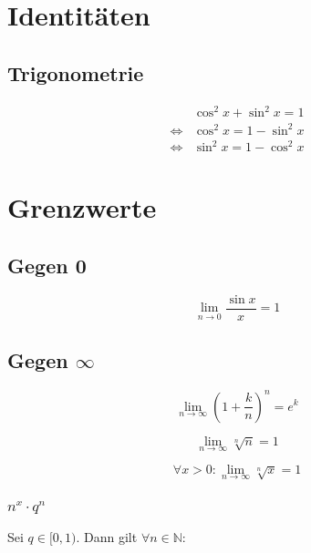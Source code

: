 \documentclass[a4paper, 16pt]{article}
\begin{document}
	\section{Identitäten}

	\subsection{Trigonometrie}

	\begin{eqnarray*}
		&\cos^2 x + \sin^2 x = 1 \\
		\Leftrightarrow &\cos^2 x = 1 - \sin^2 x \\
		\Leftrightarrow &\sin^2 x = 1 - \cos^2 x
	\end{eqnarray*}

	\section{Grenzwerte}

	\subsection{Gegen 0}

	\begin{equation*}
		\lim\limits_{n \to 0}{\frac{\sin x}{x}} = 1
	\end{equation*}

	\subsection{Gegen $\infty$}

	\begin{equation*}
		\lim\limits_{n \to \infty}{\left(1 + \frac{k}{n}\right)^n} = e^k
	\end{equation*}

	\begin{equation*}
		\lim\limits_{n \to \infty}{\sqrt[n]{n}} = 1
	\end{equation*}

	\begin{equation*}
		\forall x > 0: \lim\limits_{n \to \infty}{\sqrt[n]{x}} = 1
	\end{equation*}

	\subsubsection{$n^x \cdot q^n$}

	Sei $q \in [0, 1)$. Dann gilt $\forall n \in \mathbb{N}$:
\end{document}
